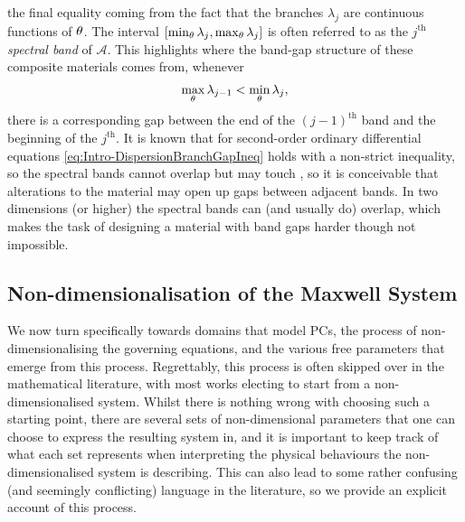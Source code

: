 the final equality coming from the fact that the branches $\lambda_j$ are continuous functions of $\theta$.
The interval $\left[  \min_{\theta}\lambda_j, \max_{\theta}\lambda_j  \right]$ is often referred to as the $j^{\text{th}}$ \emph{spectral band} of $\mathcal{A}$.
This highlights where the band-gap structure of these composite materials comes from, whenever 
\begin{align} \label{eq:Intro-DispersionBranchGapIneq}
	\max_{\theta}\lambda_{j-1} < \min_{\theta}\lambda_{j},
\end{align}
there is a corresponding gap between the end of the $(j-1)^{\text{th}}$ band and the beginning of the $j^{\text{th}}$.
It is known that for second-order ordinary differential equations \eqref{eq:Intro-DispersionBranchGapIneq} holds with a non-strict inequality, so the spectral bands cannot overlap but may touch \cite[chapter XIII]{reed1978iv}, so it is conceivable that alterations to the material may open up gaps between adjacent bands.
In two dimensions (or higher) the spectral bands can (and usually do) overlap, which makes the task of designing a material with band gaps harder though not impossible.

\subsection{Non-dimensionalisation of the Maxwell System} \label{ssec:Intro-NonDimMax}
We now turn specifically towards domains that model PCs, the process of non-dimensionalising the governing equations, and the various free parameters that emerge from this process.
Regrettably, this process is often skipped over in the mathematical literature, with most works electing to start from a non-dimensionalised system.
Whilst there is nothing wrong with choosing such a starting point, there are several sets of non-dimensional parameters that one can choose to express the resulting system in, and it is important to keep track of what each set represents when interpreting the physical behaviours the non-dimensionalised system is describing.
This can also lead to some rather confusing (and seemingly conflicting) language in the literature, so we provide an explicit account of this process.

